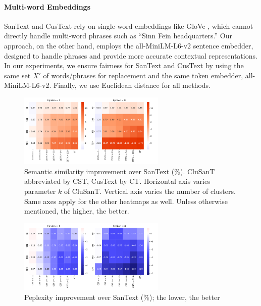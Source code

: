 \documentclass[11pt]{article}
\newcommand{\clusant}{CluSanT\xspace}
\begin{document}
\paragraph{Multi-word Embeddings} SanText and CusText rely on single-word embeddings like GloVe \cite{pennington2014glove}, which cannot directly handle multi-word phrases such as ``Sinn Fein headquarters.'' Our approach, on the other hand, employs the all-MiniLM-L6-v2 sentence embedder, designed to handle phrases and provide more accurate contextual representations. 
%
In our experiments, we ensure fairness for SanText and CusText by using the same set $X'$ of words/phrases for replacement
and the same token embedder, all-MiniLM-L6-v2. 
Finally, we use Euclidean distance for all methods. 






\begin{figure}[ht]
    \centering
    \includegraphics[width=7cm]{latex/fig/heatmap_semantic_sim_2.pdf}
    \caption{Semantic similarity improvement over SanText (\%). \clusant abbreviated by CST, CusText by CT. Horizontal axis varies parameter $k$ of \clusant. Vertical axis varies the number of clusters. Same axes apply for the other heatmaps as well. Unless otherwise mentioned, the higher, the better.}
    \label{fig:semsim_2}
\end{figure}


\begin{figure}[ht]
    \centering
    \includegraphics[width=7cm]{latex/fig/heatmap_perplexity_2.pdf}
    \caption{Peplexity improvement over SanText (\%); the lower, the better}
    \label{fig:perplexity_2}
\end{figure}
\end{document}
